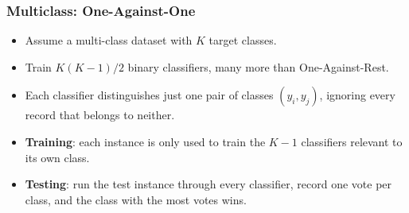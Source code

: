 \begin{frame}[fragile]\frametitle{Multiclass: One-Against-One}
\begin{itemize}
\item Assume a multi-class dataset with $K$ target classes.
\item Train $K(K-1)/2$ binary classifiers, many more than One-Against-Rest.
\item Each classifier distinguishes just one pair of classes $(y_i,y_j)$, ignoring every record that belongs to neither.
\item \textbf{Training}: each instance is only used to train the $K-1$ classifiers relevant to its own class.
\item \textbf{Testing}: run the test instance through every classifier, record one vote per class, and the class with the most votes wins.
\end{itemize}
\end{frame}
%



